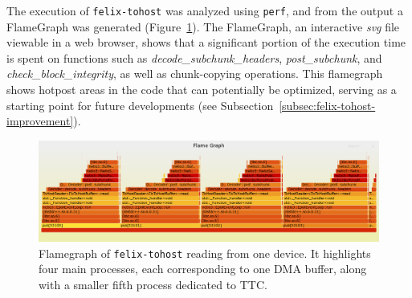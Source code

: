 The execution of \texttt{felix-tohost} was analyzed using \texttt{perf}, and from the output a FlameGraph \cite{flamegraph} was generated (Figure~\ref{fig:felix-tohost-flamegraph}). The FlameGraph, an interactive \emph{svg} file viewable in a web browser, shows that a significant portion of the execution time is spent on functions such as \emph{decode\_subchunk\_headers}, \emph{post\_subchunk}, and \emph{check\_block\_integrity}, as well as chunk-copying operations. This flamegraph shows hotpost areas in the code that can potentially be optimized, serving as a starting point for future developments (see Subsection~\ref{subsec:felix-tohost-improvement}).

\begin{figure}[htbp]
\centering
\includegraphics[width=\textwidth]{images/results/flamegraph.png}
\caption[Flamegraph of felix-tohost]{Flamegraph of \texttt{felix-tohost} reading from one device. It highlights four main processes, each corresponding to one \acs{DMA} buffer, along with a smaller fifth process dedicated to \acs{TTC}.}\label{fig:felix-tohost-flamegraph}
\end{figure}